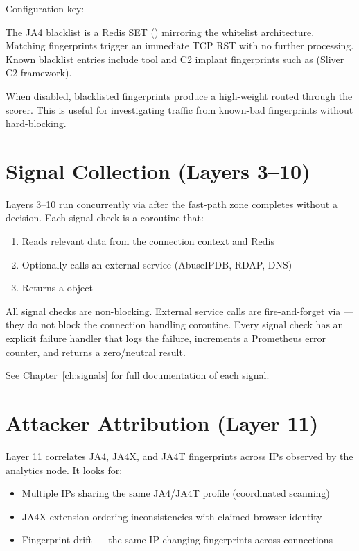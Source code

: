 Configuration key: 

The JA4 blacklist is a Redis SET () mirroring the whitelist
architecture. Matching fingerprints trigger an immediate TCP RST with no further
processing. Known blacklist entries include tool and C2 implant fingerprints such as
 (Sliver C2 framework).

When disabled, blacklisted fingerprints produce a high-weight 
routed through the scorer. This is useful for investigating traffic from
known-bad fingerprints without hard-blocking.

\section{Signal Collection (Layers 3–10)}

Layers 3–10 run concurrently via  after the fast-path zone
completes without a decision. Each signal check is a coroutine that:
\begin{enumerate}
  \item Reads relevant data from the connection context and Redis
  \item Optionally calls an external service (AbuseIPDB, RDAP, DNS)
  \item Returns a  object
\end{enumerate}

All signal checks are non-blocking. External service calls are fire-and-forget via
 — they do not block the connection handling coroutine.
Every signal check has an explicit failure handler that logs the failure, increments
a Prometheus error counter, and returns a zero/neutral result.

See Chapter~\ref{ch:signals} for full documentation of each signal.

\section{Attacker Attribution (Layer 11)}

Layer 11 correlates JA4, JA4X, and JA4T fingerprints across IPs observed by the
analytics node. It looks for:
\begin{itemize}
  \item Multiple IPs sharing the same JA4/JA4T profile (coordinated scanning)
  \item JA4X extension ordering inconsistencies with claimed browser identity
  \item Fingerprint drift — the same IP changing fingerprints across connections
\end{itemize}

